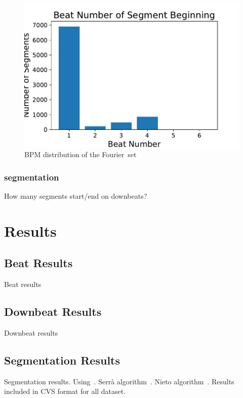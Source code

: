 \documentclass{article}
\newcommand{\setName}{Fourier}
\begin{document}
\begin{figure}
    \centerline{\includegraphics[width=\columnwidth]{figs/Downbeat_Segment_Alignment.pdf}}
    \caption{BPM distribution of the \setName~set}
    \label{fig:downbeat_segment}
\end{figure}

\subsubsection{segmentation}

How many segments start/end on downbeats?

\section{Results}\label{sec:results}

\subsection{Beat Results}

Beat results

\subsection{Downbeat Results}

Downbeat results

\subsection{Segmentation Results}

Segmentation results. Using~\cite{Nieto2016}. Serr\`a algorithm~\cite{Serra2014}. Nieto algorithm~\cite{Nieto2014}. Results included in CVS format for all dataset.
\end{document}
